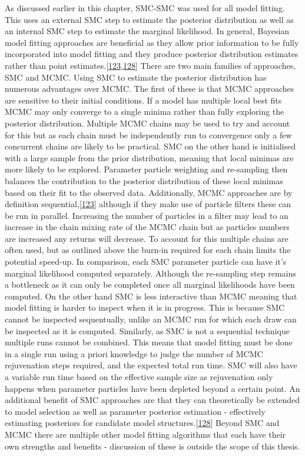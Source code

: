\documentclass[11pt,twoside]{bristolthesis}
\begin{document}
  As discussed earlier in this chapter, SMC-SMC was used for all model fitting. This uses an external SMC step to estimate the posterior distribution as well as an internal SMC step to estimate the marginal likelihood. In general, Bayesian model fitting approaches are beneficial as they allow prior information to be fully incorporated into model fitting and they produce posterior distribution estimates rather than point estimates.{[}\protect\hyperlink{ref-Murray2015}{123},\protect\hyperlink{ref-Toni2009}{128}{]} There are two main families of approaches, SMC and MCMC. Using SMC to estimate the posterior distribution has numerous advantages over MCMC. The first of these is that MCMC approaches are sensitive to their initial conditions. If a model has multiple local best fits MCMC may only converge to a single minima rather than fully exploring the posterior distribution. Multiple MCMC chains may be used to try and account for this but as each chain must be independently run to convergence only a few concurrent chains are likely to be practical. SMC on the other hand is initialised with a large sample from the prior distribution, meaning that local minimas are more likely to be explored. Parameter particle weighting and re-sampling then balances the contribution to the posterior distribution of these local minimas based on their fit to the observed data. Additionally, MCMC approaches are by definition sequential,{[}\protect\hyperlink{ref-Murray2015}{123}{]} although if they make use of particle filters these can be run in parallel. Increasing the number of particles in a filter may lead to an increase in the chain mixing rate of the MCMC chain but as particles numbers are increased any returns will decrease. To account for this multiple chains are often used, but as outlined above the burn-in required for each chain limits the potential speed-up. In comparison, each SMC parameter particle can have it's marginal likelihood computed separately. Although the re-sampling step remains a bottleneck as it can only be completed once all marginal likelihoods have been computed. On the other hand SMC is less interactive than MCMC meaning that model fitting is harder to inspect when it is in progress. This is because SMC cannot be inspected sequentually, unlike an MCMC run for which each draw can be inspected as it is computed. Similarly, as SMC is not a sequential technique multiple runs cannot be combined. This means that model fitting must be done in a single run using a priori knowledge to judge the number of MCMC rejuvenation steps required, and the expected total run time. SMC will also have a variable run time based on the effective sample size as rejuvenation only happens when parameter particles have been depleted beyond a certain point. An additional benefit of SMC approaches are that they can theoretically be extended to model selection as well as parameter posterior estimation - effectively estimating posteriors for candidate model structures.{[}\protect\hyperlink{ref-Toni2009}{128}{]} Beyond SMC and MCMC there are multiple other model fitting algorithms that each have their own strengths and benefits - discussion of these is outside the scope of this thesis.
  
\end{document}
